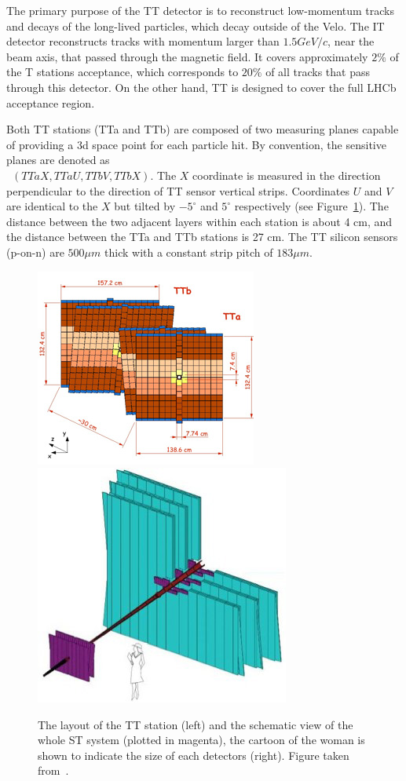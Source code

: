 The primary purpose of the TT detector is to reconstruct low-momentum tracks and decays of the long-lived particles, which decay outside of the Velo. The IT detector reconstructs tracks with momentum larger than $1.5 GeV/c$, near the beam axis, that passed through the magnetic field. It covers approximately $2\%$ of the T stations acceptance, which corresponds to $20\%$ of all tracks that pass through this detector. On the other hand, TT is designed to cover the full LHCb acceptance region.  

Both TT stations (TTa and TTb) are composed of two measuring planes capable of providing a 3d space point for each particle hit. By convention, the sensitive planes are denoted as \\ ~$(TTaX, TTaU, TTbV, TTbX)$. The $X$ coordinate is measured in the direction perpendicular to the direction of TT sensor vertical strips. Coordinates $U$ and $V$ are identical to the $X$ but tilted  by $-5^{\circ}$ and $5^{\circ}$ respectively (see Figure~\ref{fig:TT}). The distance between the two adjacent layers within each station is about 4 cm, and the distance between the TTa and TTb stations is 27 cm. The TT silicon sensors (p-on-n) are $500 \mu m$ thick with a constant strip pitch of $183 \mu m$.  

\begin{figure}[h]
 \begin{center}
  \includegraphics[width=0.49\linewidth]{figures/TT-layout.jpg}
   \includegraphics[width=0.49\linewidth]{figures/Tracking-system-diagram-2.jpg}
   \caption{The layout of the TT station (left) and the schematic view of the whole ST system (plotted in magenta), the cartoon of the woman is shown to indicate the size of each detectors (right). Figure taken from~\cite{lhcb}.  
     \label{fig:TT}}
 \end{center}
\end{figure}

